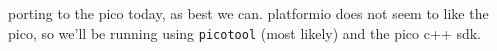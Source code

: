 porting to the pico today, as best we can. platformio does not seem to like the
pico, so we'll be running using \verb`picotool` (most likely) and the pico c++
sdk.
